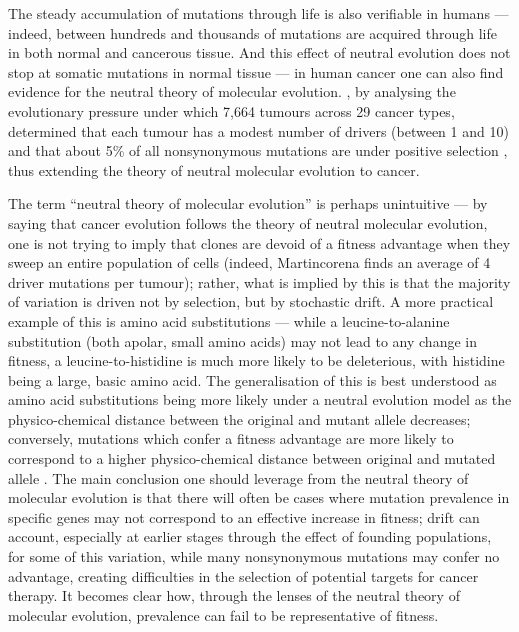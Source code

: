 The steady accumulation of mutations through life is also verifiable in humans \cite{Lee-Six2018-lp,Williams2020-ji,Yoshida2020-zi} --- indeed, between hundreds and thousands of mutations are acquired through life in both normal and cancerous tissue. And this effect of neutral evolution does not stop at somatic mutations in normal tissue --- in human cancer one can also find evidence for the neutral theory of molecular evolution. , by analysing the evolutionary pressure under which 7,664 tumours across 29 cancer types, determined that each tumour has a modest number of drivers (between 1 and 10) and that about 5\% of all nonsynonymous mutations are under positive selection \cite{Martincorena2017-ii}, thus extending the theory of neutral molecular evolution to cancer. 

The term “neutral theory of molecular evolution” is perhaps unintuitive --- by saying that cancer evolution follows the theory of neutral molecular evolution, one is not trying to imply that clones are devoid of a fitness advantage when they sweep an entire population of cells (indeed, Martincorena finds an average of 4 driver mutations per tumour); rather, what is implied by this is that the majority of variation is driven not by selection, but by stochastic drift. A more practical example of this is amino acid substitutions --- while a leucine-to-alanine substitution (both apolar, small amino acids) may not lead to any change in fitness, a leucine-to-histidine is much more likely to be deleterious, with histidine being a large, basic amino acid. The generalisation of this is best understood as amino acid substitutions being more likely under a neutral evolution model as the physico-chemical distance between the original and mutant allele decreases; conversely, mutations which confer a fitness advantage are more likely to correspond to a higher physico-chemical distance between original and mutated allele \cite{Kimura1979-ps}. The main conclusion one should leverage from the neutral theory of molecular evolution is that there will often be cases where mutation prevalence in specific genes may not correspond to an effective increase in fitness; drift can account, especially at earlier stages through the effect of founding populations, for some of this variation, while many nonsynonymous mutations may confer no advantage, creating difficulties in the selection of potential targets for cancer therapy. It becomes clear how, through the lenses of the neutral theory of molecular evolution, prevalence can fail to be representative of fitness.

